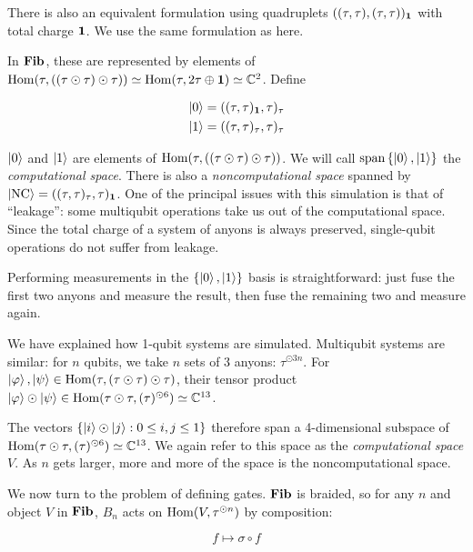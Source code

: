 There is also an equivalent formulation using quadruplets
$((\tau,\tau),(\tau,\tau))_{\mathbf{1}}$ with total charge $\mathbf{1}$. We use the same
formulation as \cite{Hormozi2007} here.

In $\mathbf{Fib}$, these are represented by elements of $\operatorname{Hom}(\tau, ((\tau \odot
\tau)\odot \tau)) \simeq \operatorname{Hom}(\tau, 2\tau \oplus \mathbf{1}) \simeq \mathbb{C}^2$. 
Define 

\begin{align}
\left|0\right> = ((\tau,\tau)_{\mathbf{1}} , \tau)_\tau \\
\left|1\right> = ((\tau,\tau)_\tau , \tau)_\tau 
\end{align}

$\left|0\right>$ and $\left|1\right>$ are elements of $\operatorname{Hom}(\tau, ((\tau \odot \tau)\odot
\tau))$. We will call $\operatorname{span}\left\{ \left|0\right>, \left|1\right> \right\}$
the \emph{computational space}. There is also a \emph{noncomputational space}
spanned by $\left|\text{NC}\right> = ((\tau,\tau)_\tau,
\tau)_{\mathbf{1}}$. One of the principal issues with this simulation is that of
``leakage'': some multiqubit operations take us out of the computational space. 
Since the total charge of a system of anyons is always preserved, single-qubit
operations do not suffer from leakage.

Performing measurements in the $\left\{ \left|0\right>, \left|1\right> \right\}$ basis is
straightforward: just fuse the first two anyons and measure the result, then
fuse the remaining two and measure again.

We have explained how 1-qubit systems are simulated. Multiqubit systems are
similar: for $n$ qubits, we take $n$ sets of $3$ anyons: $\tau^{\odot 3n}$.
For $\left|\varphi\right>,\left|\psi\right>\in \operatorname{Hom}(\tau,(\tau \odot \tau) \odot \tau)$,
their tensor product $\left|\varphi\right> \odot \left|\psi\right> \in \operatorname{Hom}(\tau \odot
\tau, (\tau)^{\odot 6}) \simeq \mathbb{C}^{13}$. 

The vectors $\left\{ \left|i\right>\odot \left|j\right> : 0 \leq i,j\leq 1 \right\}$
therefore span a 4-dimensional subspace of $\operatorname{Hom}(\tau \odot \tau, (\tau)^{\odot
6}) \simeq \mathbb{C}^{13}$. We again refer to this space as the
\emph{computational space} $V$. As $n$ gets larger, more and more of the space
is the noncomputational space. 

We now turn to the problem of defining gates. $\mathbf{Fib}$ is braided, so for any $n$
and object $V$ in $\mathbf{Fib}$, $B_n$ acts on $\operatorname{Hom}(V, \tau^{\odot n})$ by
composition: 

\begin{equation}
f \mapsto \sigma \circ f
\end{equation}

